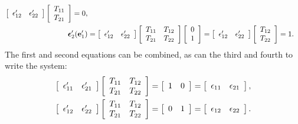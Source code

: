 \begin{subequations}
\begin{align}
  \left[ \begin{array}{c c} \epsilon_{12}' & \epsilon_{22}' \end{array} \right] 
  \left[ \begin{array}{c} T_{11} \\ T_{21} \end{array} \right] = 0 , \\
  \boldsymbol\epsilon_2'( \mathbf{e}_1' ) &= 
  \left[ \begin{array}{c c} \epsilon_{12}' & \epsilon_{22}' \end{array} \right] 
  \left[ \begin{array}{c c} T_{11} & T_{12} \\ T_{21} & T_{22} \end{array} \right] 
  \left[ \begin{array}{c} 0 \\ 1 \end{array} \right] =
  \left[ \begin{array}{c c} \epsilon_{12}' & \epsilon_{22}' \end{array} \right] 
  \left[ \begin{array}{c} T_{12} \\ T_{22} \end{array} \right] = 1 .
\end{align}
\end{subequations}
The first and second equations can be combined, as can the third and fourth to write the system:
\begin{subequations}
\begin{align}
  \left[ \begin{array}{c c} \epsilon_{11}' & \epsilon_{21}' \end{array} \right] 
  \left[ \begin{array}{c c} T_{11} & T_{12} \\ T_{21} & T_{22} \end{array} \right] =
  \left[ \begin{array}{c c} 1 & 0 \end{array} \right] =
  \left[ \begin{array}{c c} \epsilon_{11} & \epsilon_{21} \end{array} \right], \\
  \left[ \begin{array}{c c} \epsilon_{12}' & \epsilon_{22}' \end{array} \right] 
  \left[ \begin{array}{c c} T_{11} & T_{12} \\ T_{21} & T_{22} \end{array} \right] =
  \left[ \begin{array}{c c} 0 & 1 \end{array} \right] =
  \left[ \begin{array}{c c} \epsilon_{12} & \epsilon_{22} \end{array} \right] .
\end{align}
\end{subequations}
